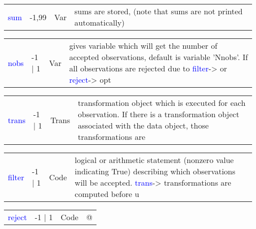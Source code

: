 \vspace{-1.51em}
\begin{table}[H]
\begin{tabular}{ m{}  m{}m{}p{}}
 \textcolor{blue}{sum} &-1,99&Var&	sums are stored, (note that sums are not printed automatically)
\\ \cline{1-4}
\end{tabular}
\end{table}
\vspace{-1.51em}
\begin{table}[H]
\begin{tabular}{ m{}  m{}m{}p{}}
 \textcolor{blue}{nobs} &-1 | 1&Var&	gives variable which will get the number of accepted observations, default is variable 'Nnobs'. If all observations are rejected due to \textcolor{blue}{filter}-> or \textcolor{blue}{reject}-> opt
\\ \cline{1-4}
\end{tabular}
\end{table}
\vspace{-1.51em}
\begin{table}[H]
\begin{tabular}{ m{}  m{}m{}p{}}
 \textcolor{blue}{trans} &-1 | 1&Trans&	transformation object which is executed for each observation. If there is a transformation object associated with the data object, those transformations are
\\ \cline{1-4}
\end{tabular}
\end{table}
\vspace{-1.51em}
\begin{table}[H]
\begin{tabular}{ m{}  m{}m{}p{}}
 \textcolor{blue}{filter} &-1 | 1&Code& logical or arithmetic statement (nonzero value indicating True) describing which observations will be accepted. \textcolor{blue}{trans}-> transformations are computed before u
\\ \cline{1-4}
\end{tabular}
\end{table}
\vspace{-1.51em}
\begin{table}[H]
\begin{tabular}{ m{}  m{}m{}p{}}
 \textcolor{blue}{reject} &-1 | 1&Code& @
\\ \cline{1-4}
\end{tabular}
\end{table}
